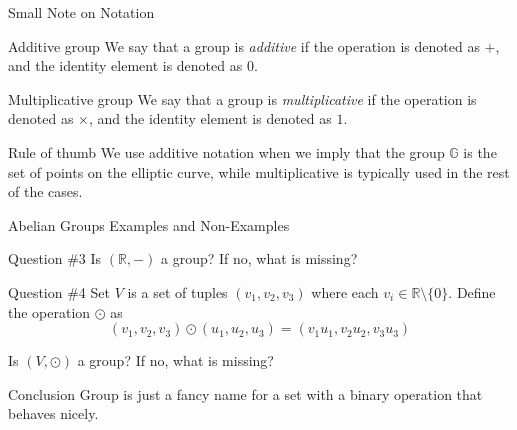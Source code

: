 \documentclass{beamer}
\begin{document}
    \begin{frame}{Small Note on Notation}
      \begin{block}{Additive group}
          We say that a group is \textit{additive} if the operation is denoted as $+$, and the identity element is denoted as $0$.
      \end{block}

      \begin{block}{Multiplicative group}
          We say that a group is \textit{multiplicative} if the operation is denoted as $\times$, and the identity element is denoted as $1$.
      \end{block}
      \begin{block}{Rule of thumb}
        We use additive notation when we imply that the group $\mathbb{G}$ is the set of points on the elliptic curve, while multiplicative is typically used in the rest of the cases.
      \end{block}
  \end{frame}

    \begin{frame}{Abelian Groups Examples and Non-Examples}
      \begin{alertblock}{Question \#3}
        Is $(\mathbb{R}, -)$ a group? If no, what is missing?
      \end{alertblock}
      \begin{alertblock}{Question \#4}
          Set $V$ is a set of tuples $(v_1,v_2,v_3)$ where each $v_i \in \mathbb{R} \setminus \{0\}$. Define the operation $\odot$ as
          \begin{equation*}
              (v_1,v_2,v_3) \odot (u_1,u_2,u_3) = (v_1u_1, v_2u_2, v_3u_3)
          \end{equation*}

          Is $(V, \odot)$ a group? If no, what is missing?
      \end{alertblock}
      \begin{block}{Conclusion}
        Group is just a fancy name for a set with a binary operation that behaves nicely.
      \end{block}
    \end{frame}
\end{document}
